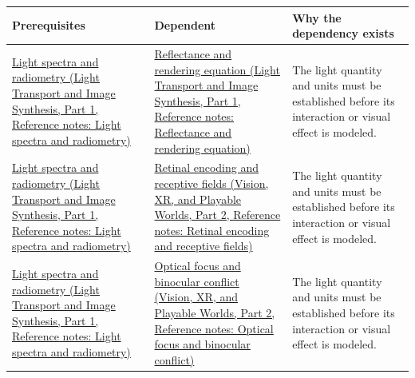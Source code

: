 {\def\LTcaptype{none} %
\begin{longtable}[]{@{}
  >{\raggedright\arraybackslash}p{}
  >{\raggedright\arraybackslash}p{}
  >{\raggedright\arraybackslash}p{}@{}}
\toprule\noalign{}
\begin{minipage}[b]{\linewidth}\raggedright
Prerequisites
\end{minipage} & \begin{minipage}[b]{\linewidth}\raggedright
Dependent
\end{minipage} & \begin{minipage}[b]{\linewidth}\raggedright
Why the dependency exists
\end{minipage} \\
\midrule\noalign{}
\endhead
\bottomrule\noalign{}
\endlastfoot
\href{../04-Light-Transport-and-Image-Synthesis-P01/main.pdf\#appendix-215c2570199b}{Light spectra and radiometry (Light Transport and Image Synthesis, Part 1, Reference notes: Light spectra and radiometry)} & \href{../04-Light-Transport-and-Image-Synthesis-P01/main.pdf\#appendix-96da0b153b77}{Reflectance and rendering equation (Light Transport and Image Synthesis, Part 1, Reference notes: Reflectance and rendering equation)} & The light quantity and units must be established before its interaction or visual effect is modeled. \\
\href{../04-Light-Transport-and-Image-Synthesis-P01/main.pdf\#appendix-215c2570199b}{Light spectra and radiometry (Light Transport and Image Synthesis, Part 1, Reference notes: Light spectra and radiometry)} & \href{../07-Vision-XR-and-Playable-Worlds-P02/main.pdf\#appendix-7281c15ac44a}{Retinal encoding and receptive fields (Vision, XR, and Playable Worlds, Part 2, Reference notes: Retinal encoding and receptive fields)} & The light quantity and units must be established before its interaction or visual effect is modeled. \\
\href{../04-Light-Transport-and-Image-Synthesis-P01/main.pdf\#appendix-215c2570199b}{Light spectra and radiometry (Light Transport and Image Synthesis, Part 1, Reference notes: Light spectra and radiometry)} & \href{../07-Vision-XR-and-Playable-Worlds-P02/main.pdf\#appendix-f90cee1be7a4}{Optical focus and binocular conflict (Vision, XR, and Playable Worlds, Part 2, Reference notes: Optical focus and binocular conflict)} & The light quantity and units must be established before its interaction or visual effect is modeled. \\

\end{longtable}}
